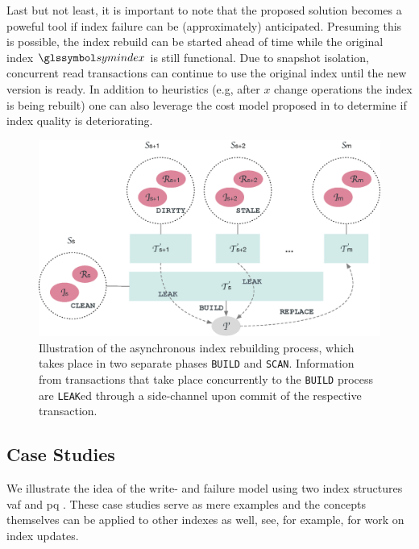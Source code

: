 Last but not least, it is important to note that the proposed solution becomes a poweful tool if index failure can be (approximately) anticipated. Presuming this is possible, the index rebuild can be started ahead of time while the original index $\symindex$ is still functional. Due to snapshot isolation, concurrent read transactions can continue to use the original index until the new version is ready. In addition to heuristics (e.g, after $x$ change operations the index is being rebuilt) one can also leverage the cost model proposed in  to determine if index quality is deteriorating.

\begin{figure}
    \centering
    \includegraphics[width=\textwidth]{figures/asynchronous-index-rebuilding}
    \caption{Illustration of the asynchronous index rebuilding process, which takes place in two separate phases \texttt{BUILD} and \texttt{SCAN}. Information from transactions that take place concurrently to the  \texttt{BUILD} process are \texttt{LEAK}ed through a side-channel upon commit of the respective transaction.}
    \label{figure:async_index_rebuild}
\end{figure}

\subsection{Case Studies}

We illustrate the idea of the write- and failure model using two index structures \acrshort{vaf} \cite{Weber:1998Va} and \acrshort{pq} \cite{Jegou:2010Product}. These case studies serve as mere examples and the concepts themselves can be applied to other indexes as well, see, for example, \cite{Olafsson:2011Dynamic} for work on index updates.

